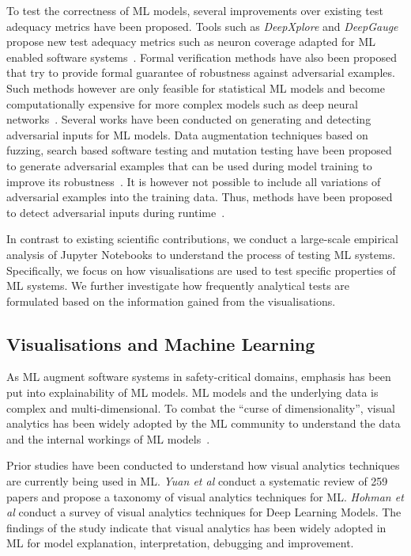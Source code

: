 To test the correctness of ML models, several improvements over existing test adequacy metrics have been proposed. Tools such as \textit{DeepXplore} and \textit{DeepGauge} propose new test adequacy metrics such as neuron coverage adapted for ML enabled software systems~\cite{pei2017deepxplore, ma2018deepgauge, gerasimou2020importance-driven}. Formal verification methods have also been proposed that try to provide formal guarantee of robustness against adversarial examples. Such methods however are only feasible for statistical ML models and become computationally expensive for more complex models such as deep neural networks~\cite{zhu2021deepmemory, baluta2021scalable}. Several works have been conducted on generating and detecting adversarial inputs for ML models. Data augmentation techniques based on fuzzing, search based software testing and mutation testing have been proposed to generate adversarial examples that can be used during model training to improve its robustness~\cite{braiek2019deepevolution, gao2020fuzz, wang2021robot, zhang2020white-box}. It is however not possible to include all variations of adversarial examples into the training data. Thus, methods have been proposed to detect adversarial inputs during runtime~\cite{xiao2021self-checking, wang2020dissector, wang2019adversarial, berend2020cats}.

In contrast to existing scientific contributions, we conduct a large-scale empirical analysis of Jupyter Notebooks to understand the process of testing ML systems. Specifically, we focus on how visualisations are used to test specific properties of ML systems. We further investigate how frequently analytical tests are formulated based on the information gained from the visualisations.

\subsection{Visualisations and Machine Learning}\label{sec:visualisations}

As ML augment software systems in safety-critical domains, emphasis has been put into explainability of ML models. ML models and the underlying data is complex and multi-dimensional. To combat the ``curse of dimensionality'', visual analytics has been widely adopted by the ML community to understand the data and the internal workings of ML models~\cite{yuan2021survey,hohman2019visual,wexler2019what-if}.

Prior studies have been conducted to understand how visual analytics techniques are currently being used in ML. \emph{Yuan et al} conduct a systematic review of 259 papers and propose a taxonomy of visual analytics techniques for ML. \emph{Hohman et al} conduct a survey of visual analytics techniques for Deep Learning Models. The findings of the study indicate that visual analytics has been widely adopted in ML for model explanation, interpretation, debugging and improvement.

